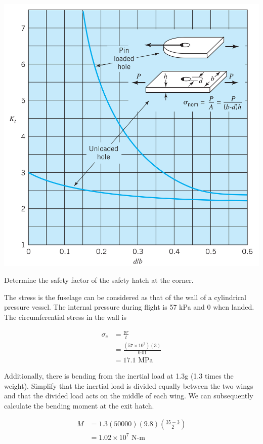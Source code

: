 \documentclass[a4paper,openany,nobib]{tufte-book}
\begin{document}
\begin{center}
\includegraphics[width=.9\linewidth]{pictures/Static-body-load-analysis/stress-conc-axial-plate.png}
\end{center}

Determine the safety factor of the safety hatch at the corner.

The stress is the fuselage can be considered as that of the wall of a
cylindrical pressure vessel. The internal pressure during flight is 57
kPa and 0 when landed. The circumferential stress in the wall is

$$\begin{aligned}
    \sigma_c &= \frac{pr}{t} \\
             &= \frac{(57 \times 10^3)(3)}{0.01} \\
             &= 17.1 \text{ MPa}
  \end{aligned}$$

Additionally, there is bending from the inertial load at 1.3g (1.3 times
the weight). Simplify that the inertial load is divided equally between
the two wings and that the divided load acts on the middle of each wing.
We can subsequently calculate the bending moment at the exit hatch.

$$\begin{aligned}
    M &= 1.3(50000)(9.8) \left( \frac{35-3}{2} \right) \\
      &= 1.02 \times 10^7 \text{ N-m}
  \end{aligned}$$
\end{document}
